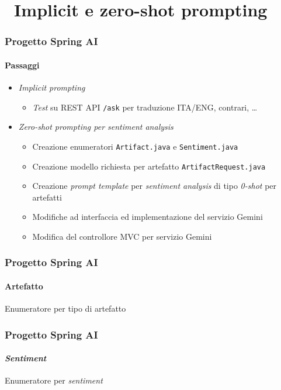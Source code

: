 \section{\faWrench\ Implicit e zero-shot prompting} %
\label{sec:spring-ai-gemini-implicit-zero-shot-prompting}
%
\begin{frame}[t,fragile] \frametitle{Progetto Spring AI}
    \framesubtitle{Passaggi}
    {\small
        \begin{itemize}[leftmargin=10pt,align=right]
            \item[\alert{\faArrowCircleRight}] \textit{Implicit prompting}
            \begin{itemize}[leftmargin=10pt,align=right]
                \item[\alertedcircled{1}] \textit{Test} su REST API \texttt{/ask} per traduzione ITA/ENG, contrari, \ldots
            \end{itemize}
            \item[\alert{\faArrowCircleRight}] \textit{\textit{Zero-shot prompting} per \textit{sentiment analysis}}
            \begin{itemize}[leftmargin=10pt,align=right]
                \item[\alertedcircled{1}] Creazione enumeratori \texttt{Artifact.java} e \texttt{Sentiment.java}
                \item[\alertedcircled{2}] Creazione modello richiesta per artefatto \texttt{ArtifactRequest.java}
                \item[\alertedcircled{3}] Creazione \textit{prompt template} per \textit{sentiment analysis} di tipo \textit{0-shot} per artefatti
                \item[\alertedcircled{4}] Modifiche ad interfaccia ed implementazione del servizio Gemini
                \item[\alertedcircled{5}] Modifica del controllore MVC per servizio Gemini
            \end{itemize}
        \end{itemize}
    }
\end{frame}
%
\begin{frame}[t,fragile] \frametitle{Progetto Spring AI}
    \framesubtitle{Artefatto}
        \begin{block}{Enumeratore per tipo di artefatto}
			{\tiny}
    	\end{block}
\end{frame}
%
\begin{frame}[t,fragile] \frametitle{Progetto Spring AI}
    \framesubtitle{\textit{Sentiment}}
        \begin{block}{Enumeratore per \textit{sentiment}}
			{\tiny}
    	\end{block}
\end{frame}
